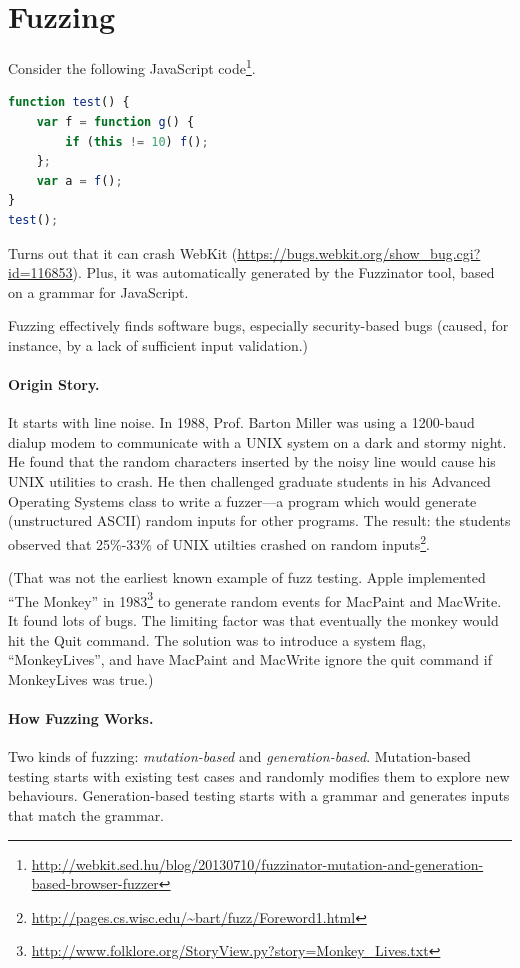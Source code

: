 \documentclass[11pt]{article}
\begin{document}
\section*{Fuzzing}

Consider the following JavaScript code\footnote{\url{http://webkit.sed.hu/blog/20130710/fuzzinator-mutation-and-generation-based-browser-fuzzer}}.
\begin{lstlisting}[language=JavaScript]
function test() {
    var f = function g() {
        if (this != 10) f();
    };
    var a = f();
}
test();
\end{lstlisting}
Turns out that it can crash WebKit (\url{https://bugs.webkit.org/show_bug.cgi?id=116853}).
Plus, it was automatically generated by the Fuzzinator tool, based on a grammar for JavaScript.

Fuzzing effectively finds
software bugs, especially security-based bugs (caused, for instance,
by a lack of sufficient input validation.)

\paragraph{Origin Story.} It starts with line noise.
In 1988, Prof. Barton Miller was using a 1200-baud dialup modem to
communicate with a UNIX system on a dark and stormy night.  He found
that the random characters inserted by the noisy line would cause his
UNIX utilities to crash. He then challenged graduate students in his
Advanced Operating Systems class to write a fuzzer---a program which
would generate (unstructured ASCII) random inputs for other programs.
The result: the students observed that 25\%-33\% of UNIX utilties
crashed on random inputs\footnote{\url{http://pages.cs.wisc.edu/~bart/fuzz/Foreword1.html}}.

(That was not the earliest known example of fuzz testing. Apple
implemented ``The Monkey'' in 1983\footnote{\url{http://www.folklore.org/StoryView.py?story=Monkey_Lives.txt}}
to generate random events for
MacPaint and MacWrite. It found lots of bugs. The limiting factor was
that eventually the monkey would hit the Quit command.  The solution
was to introduce a system flag, ``MonkeyLives'', and have MacPaint and
MacWrite ignore the quit command if MonkeyLives was true.)

\paragraph{How Fuzzing Works.} 
Two kinds of fuzzing: \emph{mutation-based} and
\emph{generation-based}. Mutation-based testing starts with
existing test cases and randomly modifies them to explore new behaviours.
Generation-based testing starts with a grammar and generates
inputs that match the grammar.
\end{document}
